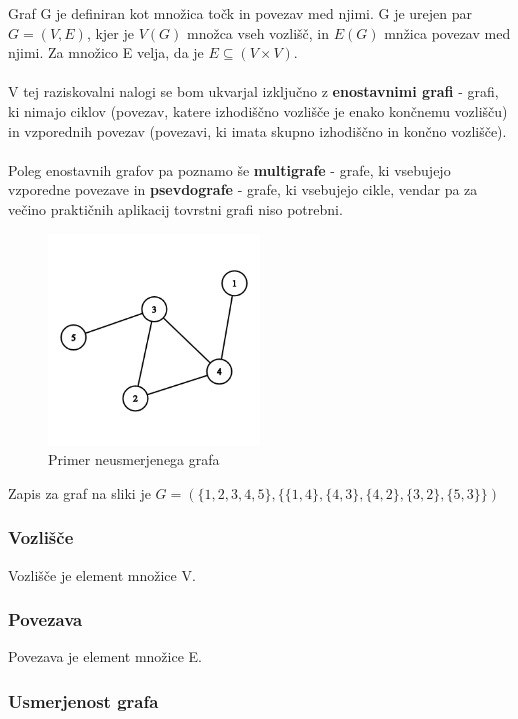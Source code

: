 \documentclass[11pt]{article}
\begin{document}
Graf G je definiran kot množica točk in povezav med njimi. G je urejen par $G = (V, E)$, kjer je $V(G)$ množca vseh vozlišč, in $E(G)$ mnžica povezav med njimi.
Za množico E velja, da je $E \subseteq (V \times V)$.
\\  \\
V tej raziskovalni nalogi se bom ukvarjal izključno z \textbf{enostavnimi grafi} - grafi, ki nimajo ciklov (povezav, katere izhodiščno vozlišče je enako končnemu vozlišču) in vzporednih povezav (povezavi, ki imata skupno izhodiščno in končno vozlišče). 
\\ \\
Poleg enostavnih grafov pa poznamo še \textbf{multigrafe} - grafe, ki vsebujejo vzporedne povezave in \textbf{psevdografe} - grafe, ki vsebujejo cikle, vendar pa za večino praktičnih aplikacij tovrstni grafi niso potrebni.

\begin{figure}[H]
    \centering
    \includegraphics[width=0.5\textwidth]{unweighted_graph.png}
    \caption{Primer neusmerjenega grafa}
    \label{fig:mesh1}
\end{figure}

Zapis za graf na sliki je $G = (\{1, 2, 3, 4, 5\}, \{\{1, 4\}, \{4, 3\}, \{4, 2\}, \{3, 2\}, \{5, 3\}\})$

\subsubsection{Vozlišče}

Vozlišče je element množice V.

\subsubsection{Povezava}

Povezava je element množice E.

\subsubsection{Usmerjenost grafa}
\end{document}
